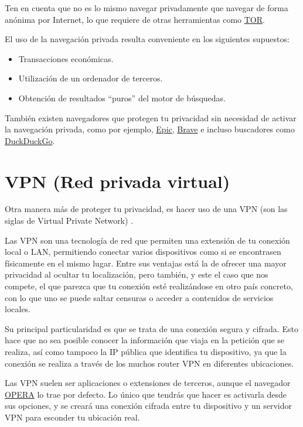 \documentclass[
  a4paper,
  openany]{book}
\providecommand{\tightlist}{%
  \setlength{\itemsep}{0pt}\setlength{\parskip}{0pt}}
\begin{document}
Ten en cuenta que no es lo mismo navegar privadamente que navegar de forma anónima por Internet, lo que requiere de otras herramientas como \href{https://www.torproject.org/}{TOR}.

El uso de la navegación privada resulta conveniente en los siguientes supuestos:

\begin{itemize}
\tightlist
\item
  Transacciones económicas.
\item
  Utilización de un ordenador de terceros.
\item
  Obtención de resultados ``puros'' del motor de búsquedas.
\end{itemize}

También existen navegadores que protegen tu privacidad sin necesidad de activar la navegación privada, como por ejemplo, \href{https://www.epicbrowser.com/}{Epic}, \href{https://brave.com/es/}{Brave} e incluso buscadores como \href{https://duckduckgo.com/}{DuckDuckGo}.

\hypertarget{vpn-red-privada-virtual}{%
\section{VPN (Red privada virtual)}\label{vpn-red-privada-virtual}}

Otra manera más de proteger tu privacidad, es hacer uso de una VPN (son las siglas de Virtual Private Network) \citep{AVAST-vpn}.

Las VPN son una tecnología de red que permiten una extensión de tu conexión local o LAN, permitiendo conectar varios dispositivos como si se encontrasen físicamente en el mismo lugar. Entre sus ventajas está la de ofrecer una mayor privacidad al ocultar tu localización, pero también, y este el caso que nos compete, el que parezca que tu conexión esté realizándose en otro país concreto, con lo que uno se puede saltar censuras o acceder a contenidos de servicios locales.

Su principal particularidad es que se trata de una conexión segura y cifrada. Esto hace que no sea posible conocer la información que viaja en la petición que se realiza, así como tampoco la IP pública que identifica tu dispositivo, ya que la conexión se realiza a través de los muchos router VPN en diferentes ubicaciones.

Las VPN suelen ser aplicaciones o extensiones de terceros, aunque el navegador \href{https://www.opera.com/es}{OPERA} lo trae por defecto. Lo único que tendrás que hacer es activarla desde sus opciones, y se creará una conexión cifrada entre tu dispositivo y un servidor VPN para esconder tu ubicación real.
\end{document}
